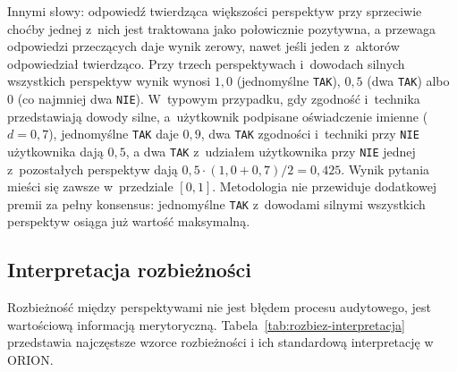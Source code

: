 Innymi słowy: odpowiedź twierdząca większości perspektyw przy sprzeciwie
choćby jednej z~nich jest traktowana jako połowicznie pozytywna,
a przewaga odpowiedzi przeczących daje wynik zerowy, nawet jeśli
jeden z~aktorów odpowiedział twierdząco. Przy trzech perspektywach
i~dowodach silnych wszystkich perspektyw wynik wynosi $1{,}0$ (jednomyślne \texttt{TAK}),
$0{,}5$ (dwa \texttt{TAK}) albo $0$ (co najmniej dwa \texttt{NIE}).
W~typowym przypadku, gdy zgodność i~technika przedstawiają dowody silne, a~użytkownik
podpisane oświadczenie imienne ($d = 0{,}7$), jednomyślne \texttt{TAK} daje $0{,}9$,
dwa \texttt{TAK} zgodności i~techniki przy \texttt{NIE} użytkownika dają $0{,}5$,
a dwa \texttt{TAK} z~udziałem użytkownika przy \texttt{NIE} jednej z~pozostałych perspektyw
dają $0{,}5 \cdot (1{,}0 + 0{,}7)/2 = 0{,}425$.
Wynik pytania mieści się zawsze w~przedziale $[0, 1]$. Metodologia
nie przewiduje dodatkowej premii za pełny konsensus: jednomyślne
\texttt{TAK} z~dowodami silnymi wszystkich perspektyw osiąga już wartość maksymalną.

\subsection{Interpretacja rozbieżności}
\label{sec:interpretacja-rozbiez}

Rozbieżność między perspektywami nie jest błędem
procesu audytowego, jest wartościową informacją
merytoryczną. Tabela~\ref{tab:rozbiez-interpretacja}
przedstawia najczęstsze wzorce rozbieżności
i ich standardową interpretację w ORION.

